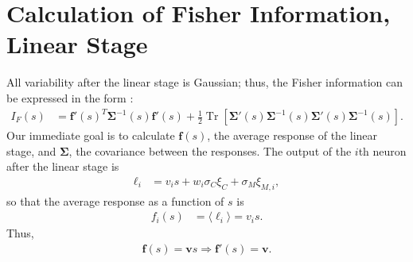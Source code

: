 \documentclass[11pt]{article}
\DeclareMathOperator{\Tr}{Tr}
\begin{document}
	\section{Calculation of  Fisher Information, Linear Stage}\label{app:fisher-linear}
	All variability after the linear stage is Gaussian; thus, the Fisher information can be expressed in the form \cite{1999abbott_dayan, 1993kay}:
	\begin{align}
		I_{F}(s) &= \mathbf{f}'(s)^T \boldsymbol{\Sigma}^{-1} (s) \mathbf{f}'(s) + \frac{1}{2}\Tr\left[\boldsymbol{\Sigma}'(s) \boldsymbol{\Sigma}^{-1}(s)\boldsymbol{\Sigma}'(s) \boldsymbol{\Sigma}^{-1}(s)\right]. \label{IF-gaussian}
	\end{align}
	Our immediate goal is to calculate $\mathbf{f}(s)$, the average response of the linear stage, and $\boldsymbol{\Sigma}$, the covariance between the responses. The output of the $i$th neuron after the linear stage is
	\begin{align}
		\ell_i &= v_i s + w_i \sigma_C \xi_C + \sigma_M\xi_{M,i},
	\end{align}
	so that the average response as a function of $s$ is
	\begin{align}
		f_i(s) &= \langle \ell_i \rangle = v_i s.
	\end{align}
	Thus,
	\begin{align}
		\mathbf{f}(s) = \mathbf{v}s \Rightarrow \mathbf{f}'(s) = \mathbf{v}.
	\end{align}
	
\end{document}
